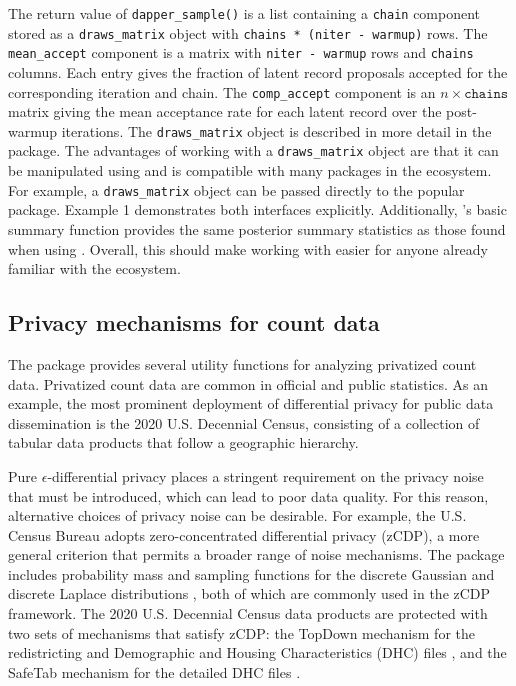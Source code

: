 The return value of \texttt{dapper\_sample()} is a list containing a \texttt{chain} component stored as
a \texttt{draws\_matrix} object with \texttt{chains\ *\ (niter\ -\ warmup)} rows. The
\texttt{mean\_accept} component is a matrix with \texttt{niter\ -\ warmup} rows and \texttt{chains}
columns. Each entry gives the fraction of latent record proposals accepted for
the corresponding iteration and chain. The \texttt{comp\_accept} component is an
\(n \times \texttt{chains}\) matrix giving the mean acceptance rate for each
latent record over the post-warmup iterations. The \texttt{draws\_matrix} object is described
in more detail in the  \citep{posterior_pkg} package. The advantages of working
with a \texttt{draws\_matrix} object are that it can be manipulated using  and is
compatible with many packages in the  ecosystem. For example, a
\texttt{draws\_matrix} object can be passed directly to the popular 
\citep{bayesplot_pkg} package. Example 1 demonstrates both interfaces explicitly. Additionally,
's basic summary function provides the same posterior summary statistics
as those found when using . Overall, this should make working with  easier
for anyone already familiar with the  ecosystem.

\subsection{Privacy mechanisms for count data}\label{sec:dp_count}

The  package provides several utility functions
for analyzing privatized count data. Privatized count data are common in official and public statistics.
As an example, the most prominent deployment of differential privacy for public data dissemination is the 2020 U.S. Decennial Census, consisting of a collection of tabular data products that follow a geographic hierarchy.

Pure \(\epsilon\)-differential privacy places a stringent requirement on the privacy noise that must be introduced,
which can lead to poor data quality. For this reason, alternative choices of privacy noise can be desirable.
For example, the U.S. Census Bureau adopts zero-concentrated differential privacy (zCDP), a more general criterion that permits a broader range of noise mechanisms.
The  package includes probability mass and sampling functions
for the discrete Gaussian and discrete Laplace distributions \citep{Canonne2022}, both of which are commonly used in the zCDP framework.
The 2020 U.S. Decennial Census data products are protected with two sets of mechanisms that satisfy zCDP: the TopDown mechanism for the redistricting and Demographic and Housing Characteristics (DHC) files \citep{Abowd2022}, and the SafeTab mechanism for the detailed DHC files \citep{TumultLabs2022}.

